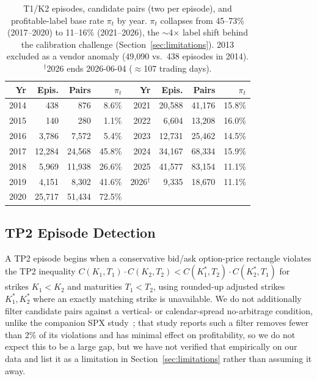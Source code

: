 \documentclass[sigconf,review]{acmart}
\begin{document}
\begin{table}[t]
\centering
\footnotesize
\begin{tabular}{rrrr@{\hskip 1.4em}rrrr}
\toprule
Yr & Epis. & Pairs & $\pi_t$ & Yr & Epis. & Pairs & $\pi_t$ \\
\midrule
2014 & 438 & 876 & 8.6\% & 2021 & 20{,}588 & 41{,}176 & 15.8\% \\
2015 & 140 & 280 & 1.1\% & 2022 & 6{,}604 & 13{,}208 & 16.0\% \\
2016 & 3{,}786 & 7{,}572 & 5.4\% & 2023 & 12{,}731 & 25{,}462 & 14.5\% \\
2017 & 12{,}284 & 24{,}568 & 45.8\% & 2024 & 34{,}167 & 68{,}334 & 15.9\% \\
2018 & 5{,}969 & 11{,}938 & 26.6\% & 2025 & 41{,}577 & 83{,}154 & 11.1\% \\
2019 & 4{,}151 & 8{,}302 & 41.6\% & 2026$^\dagger$ & 9{,}335 & 18{,}670 & 11.1\% \\
2020 & 25{,}717 & 51{,}434 & 72.5\% & & & & \\
\bottomrule
\end{tabular}
\caption{T1/K2 episodes, candidate pairs (two per episode), and profitable-label base rate $\pi_t$ by year. $\pi_t$ collapses from 45--73\% (2017--2020) to 11--16\% (2021--2026), the $\sim$4$\times$ label shift behind the calibration challenge (Section~\ref{sec:limitations}). 2013 excluded as a vendor anomaly (49{,}090 vs.\ 438 episodes in 2014). $^\dagger$2026 ends 2026-06-04 ($\approx$107 trading days).}
\label{tab:peryear}
\end{table}

\subsection{TP2 Episode Detection}
A TP2 episode begins when a conservative bid/ask option-price rectangle violates the TP2 inequality $C(K_1,T_1)\cdot C(K_2,T_2) < C(K_1^{\ast},T_2)\cdot C(K_2^{\ast},T_1)$ for strikes $K_1 < K_2$ and maturities $T_1 < T_2$, using rounded-up adjusted strikes $K_1^{\ast}, K_2^{\ast}$ where an exactly matching strike is unavailable. We do not additionally filter candidate pairs against a vertical- or calendar-spread no-arbitrage condition, unlike the companion SPX study~\cite{glasserman2025tp2}; that study reports such a filter removes fewer than 2\% of its violations and has minimal effect on profitability, so we do not expect this to be a large gap, but we have not verified that empirically on our data and list it as a limitation in Section~\ref{sec:limitations} rather than assuming it away.
\end{document}
